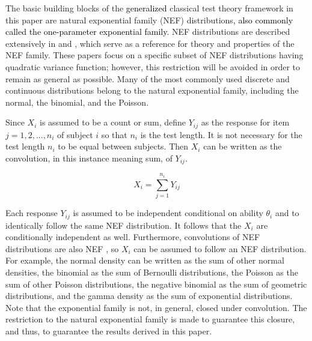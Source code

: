 \documentclass[12pt,epsfig]{article}
\newcommand{\change}[1]{\textcolor{black}{#1}}
\newcommand{\changed}[1]{\textcolor{black}{#1}}
\begin{document}

The basic building blocks of the \change{generalized} classical test theory framework in this paper are natural exponential family (NEF) distributions\changed{, also commonly called the one-parameter exponential family}. NEF distributions are described extensively in \cite{Morris1982} and \cite{Morris1983}, which serve as a reference for theory and properties of the NEF family. These papers focus on a specific subset of NEF distributions having quadratic variance function; however, this restriction will be avoided in order to remain as general as possible. Many of the most commonly used discrete and continuous distributions belong to the natural exponential family, including the normal, the binomial, and the Poisson. 

Since $X_i$ is assumed to be a count or sum, define $Y_{ij}$ as the response for item $j = 1, 2, ..., n_i$ of subject $i$ so that $n_i$ is the test length. It is not necessary for the test length $n_i$ to be equal between subjects. Then $X_i$ can be written as the convolution, in this instance meaning sum, of $Y_{ij}$.


\begin{equation*}
X_i = \displaystyle \sum_{j = 1}^{n_i} Y_{ij}
\end{equation*}


\noindent Each response $Y_{ij}$ is assumed to be independent conditional on ability $\theta_i$ and to identically follow the same NEF distribution. It follows that the $X_i$ are conditionally independent as well. Furthermore, convolutions of NEF distributions are also NEF \citep{Morris1982}, so $X_i$ can be assumed to follow an NEF distribution. For example, the normal density can be written as the sum of other normal densities, the binomial as the sum of Bernoulli distributions, the Poisson as the sum of other Poisson distributions, the negative binomial as the sum of geometric distributions, and the gamma density as the sum of exponential distributions. Note that the exponential family is not, in general, closed under convolution. The restriction to the natural exponential family is made to guarantee this closure, and thus, to guarantee the results derived in this paper. 
\end{document}
